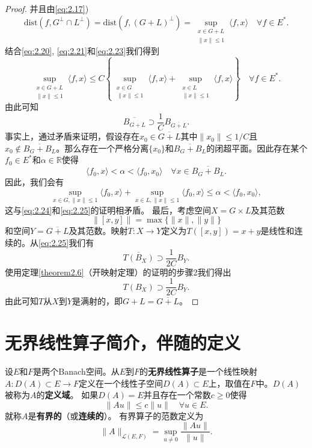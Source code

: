 \begin{proof}
并且由\eqref{eq:2.17})
\begin{equation}
\text{dist}(f, G^\perp \cap L^\perp) = \text{dist}(f, (G+L)^\perp) = \sup_{\substack{x \in G+L \\ \|x\| \leq 1}} \langle f, x \rangle \quad \forall f \in E^*. \label{eq:2.23}
\end{equation}
结合\eqref{eq:2.20}, \eqref{eq:2.21}和\eqref{eq:2.23}我们得到
\begin{equation}
\sup_{\substack{x \in G+L \\ \|x\| \leq 1}} \langle f, x \rangle \leq C \left\{ \sup_{\substack{x \in G \\ \|x\| \leq 1}} \langle f, x \rangle + \sup_{\substack{x \in L \\ \|x\| \leq 1}} \langle f, x \rangle \right\} \quad \forall f \in E^*. \label{eq:2.24}
\end{equation}
由此可知
\begin{equation}
\overline{B_{G+L}} \supset \frac{1}{C} B_{\overline{G+L}}. \label{eq:2.25}
\end{equation}
事实上，通过矛盾来证明，假设存在$x_0 \in \overline{G+L}$其中$\|x_0\| \leq 1/C$且$x_0 \notin \overline{B_G+B_L}$。那么存在一个严格分离$\{x_0\}$和$\overline{B_G+B_L}$的闭超平面。因此存在某个$f_0 \in E^*$和$\alpha \in \mathbb{R}$使得
\[ \langle f_0, x \rangle < \alpha < \langle f_0, x_0 \rangle \quad \forall x \in \overline{B_G+B_L}. \]
因此，我们会有
\[ \sup_{x \in G, \|x\| \leq 1} \langle f_0, x \rangle + \sup_{x \in L, \|x\| \leq 1} \langle f_0, x \rangle \leq \alpha < \langle f_0, x_0 \rangle, \]
这与\eqref{eq:2.24}和\eqref{eq:2.25}的证明相矛盾。
最后，考虑空间$X=G \times L$及其范数
\[ \|[x,y]\| = \max\{\|x\|, \|y\|\} \]
和空间$Y=\overline{G+L}$及其范数。映射$T:X \to Y$定义为$T([x,y])=x+y$是线性和连续的。从\eqref{eq:2.25}我们有
\[ \overline{T(B_X)} \supset \frac{1}{2C} B_Y. \]
使用定理\ref{theorem2.6}（开映射定理）的证明的步骤2我们得出
\[ T(B_X) \supset \frac{1}{2C} B_Y. \]
由此可知$T$从$X$到$Y$是满射的，即$G+L=\overline{G+L}$。
\end{proof}

\section{无界线性算子简介，伴随的定义}

\begin{definition}
设$E$和$F$是两个Banach空间。从$E$到$F$的\textbf{无界线性算子}是一个线性映射$A:D(A) \subset E \to F$定义在一个线性子空间$D(A) \subset E$上，取值在$F$中。$D(A)$被称为$A$的\textbf{定义域}。
如果$D(A)=E$并且存在一个常数$c \geq 0$使得
\[ \|Au\| \leq c\|u\| \quad \forall u \in E. \]
就称$A$是\textbf{有界的}（或\textbf{连续的}）。
有界算子的范数定义为
\[ \|A\|_{\mathcal{L}(E,F)} = \sup_{u \neq 0} \frac{\|Au\|}{\|u\|}. \]
\end{definition}

